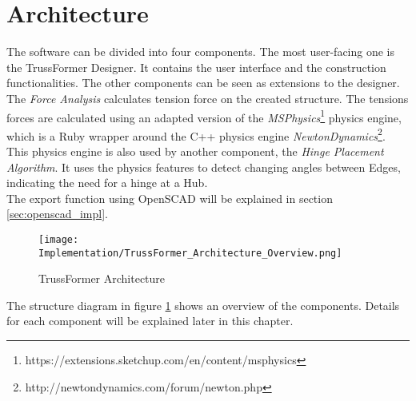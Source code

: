\section{Architecture}
The software can be divided into four components. The most user-facing one is the TrussFormer Designer. It contains the user interface and the construction functionalities. The other components can be seen as extensions to the designer. The \textit{Force Analysis} calculates tension force on the created structure. The tensions forces are calculated using an adapted version of the \textit{MSPhysics}\footnote{https://extensions.sketchup.com/en/content/msphysics} physics engine, which is a Ruby wrapper around the C++ physics engine \textit{NewtonDynamics}\footnote{http://newtondynamics.com/forum/newton.php}.\\
This physics engine is also used by another component, the \textit{Hinge Placement Algorithm}. It uses the physics features to detect changing angles between Edges, indicating the need for a hinge at a Hub.\\
The export function using OpenSCAD will be explained in section \ref{sec:openscad_impl}.
\begin{figure}[!h]
    \texttt{[image: Implementation/TrussFormer\_Architecture\_Overview.png]}
    \centering
    \caption{TrussFormer Architecture}
    \label{fig:architecture}
\end{figure}
The structure diagram in figure \ref{fig:architecture} shows an overview of the components. Details for each component will be explained later in this chapter.

